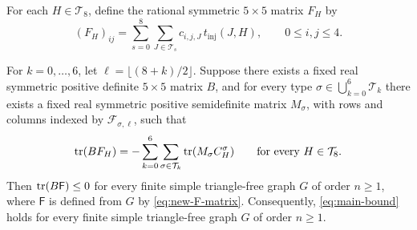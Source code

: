 For each $H\in\mathcal T_8$, define the rational symmetric
$5\times5$ matrix $F_H$ by
\begin{equation}\label{eq:FH}
(F_H)_{ij}
=\sum_{s=0}^8\sum_{J\in\mathcal T_s}
c_{i,j,J}\,t_{\mathrm{inj}}(J,H),
\qquad 0\leq i,j\leq4.
\end{equation}
\begin{lemma}\label{lem:finite-trace-reduction}
For $k=0,\ldots,6$, let $\ell=\lfloor(8+k)/2\rfloor$.
Suppose there exists a fixed real symmetric positive definite
$5\times5$ matrix $B$, and for every type
$\sigma\in\bigcup_{k=0}^6\mathcal T_k$ there exists a fixed real
symmetric positive semidefinite matrix $M_\sigma$, with rows and columns
indexed by $\mathcal F_{\sigma,\ell}$, such that
\begin{equation}\label{eq:finite-trace-identities}
\operatorname{tr}(BF_H)
=-\sum_{k=0}^6\sum_{\sigma\in\mathcal T_k}
\operatorname{tr}(M_\sigma C_H^\sigma)
\qquad\text{for every }H\in\mathcal T_8.
\end{equation}
Then $\operatorname{tr}(B\mathsf F)\leq0$ for every finite simple triangle-free graph
$G$ of order $n\geq1$, where $\mathsf F$ is defined from $G$ by
\eqref{eq:new-F-matrix}.
Consequently, \eqref{eq:main-bound} holds for every finite simple
triangle-free graph $G$ of order $n\geq1$.
\end{lemma}
